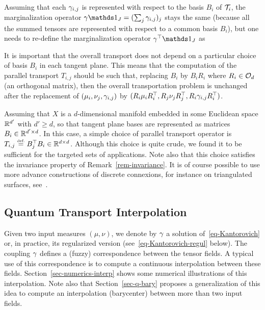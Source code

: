Assuming that each $\gamma_{i,j}$ is represented with respect to the basis $B_i$ of $\mathcal{T}_i$, the marginalization operator $\ga \ones_J = (\sum_j \ga_{i,j})_j$ stays the same (because all the summed tensors are represented with respect to a common basis $B_i$), but one needs to re-define the marginalization operator $\ga^\top \ones_J$ as


\begin{rem}\label{rem-invariance}
	It is important that the overall transport does not depend on a particular choice of basis $B_i$ in each tangent plane. This means that the computation of the parallel transport $T_{i,j}$ should be such that, replacing $B_i$ by $B_i R_i$ where $R_i \in \mathcal{O}_d$ (an orthogonal matrix), then the overall transportation problem is unchanged after the replacement of $(\mu_i,\nu_j,\gamma_{i,j})$ by $(R_i \mu_i R_i^\top, R_j \nu_j R_j^\top, R_i\gamma_{i,j}R_i^\top)$.
\end{rem}

\begin{rem}
	Assuming that $X$ is a $d$-dimensional manifold embedded in some Euclidean space $\mathbb{R}^{d'}$ with $d' \geq d$, so that tangent plane bases are represented as matrices $B_i \in \mathbb{R}^{d' \times d}$. In this case, a simple choice of parallel transport operator is $T_{i,j} \eqdef B_j^\top B_i \in \RR^{d \times d}$. Although this choice is quite crude, we found it to be sufficient for the targeted sets of applications. Note also that this choice satisfies the invariance property of Remark~\ref{rem-invariance}. It is of course possible to use more advance constructions of discrete connexions, for instance on triangulated surfaces, see~\cite{crane2010trivial,liu2016discrete}.
\end{rem}

\fi

\subsection{Quantum Transport Interpolation}

\newcommand{\muA}{\mu}
\newcommand{\muB}{\nu}


Given two input measures $(\muA,\muB)$, we denote by $\gamma$ a solution of~\eqref{eq-Kantorovich} or, in practice, its regularized version (see~\eqref{eq-Kantorovich-regul} below). The coupling $\gamma$ defines a (fuzzy) correspondence between the tensor fields. A typical use of this correspondence is to compute a continuous interpolation between these fields. Section~\ref{sec-numerics-interp} shows some numerical illustrations of this interpolation. Note also that Section~\ref{sec-q-bary} proposes a generalization of this idea to compute an interpolation (barycenter) between more than two input fields.  


